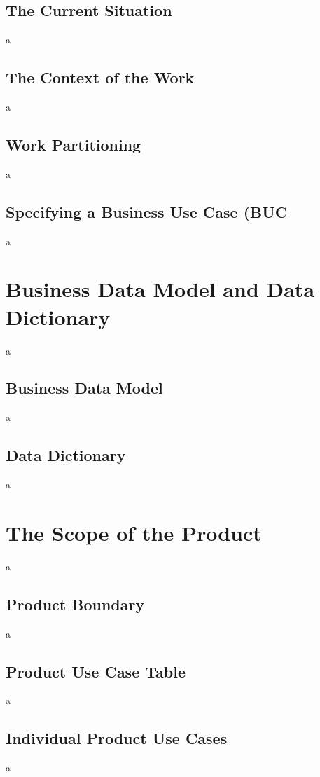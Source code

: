 \documentclass[12pt]{article}
\begin{document}
\subsection{The Current Situation}
a

\subsection{The Context of the Work}
a

\subsection{Work Partitioning}
a

\subsection{Specifying a Business Use Case (BUC}
a

\section{Business Data Model and Data Dictionary}
a

\subsection{Business Data Model}
a

\subsection{Data Dictionary}
a

\section{The Scope of the Product}
a

\subsection{Product Boundary}
a

\subsection{Product Use Case Table}
a

\subsection{Individual Product Use Cases}
a
\end{document}
